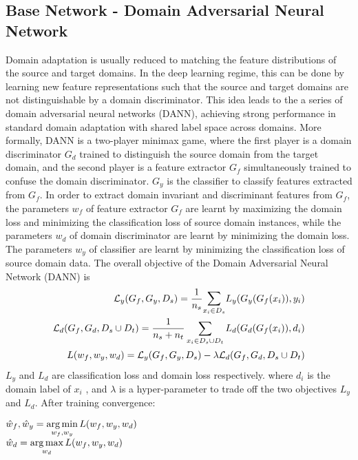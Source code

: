 \subsection{Base Network - Domain Adversarial Neural Network}
Domain adaptation is usually reduced to matching the feature distributions of the source and target domains. In the deep learning regime, this can be done by
learning new feature representations such that the source and target domains
are not distinguishable by a domain discriminator. This idea leads to the a series
of domain adversarial neural networks (DANN)\cite{uda,dann,deeptransfer}, achieving strong performance
in standard domain adaptation with shared label space across domains.
More formally, DANN is a two-player minimax game, where the first player is
a domain discriminator $G_d$ trained to distinguish the source domain from the
target domain, and the second player is a feature extractor $G_f$ simultaneously
trained to confuse the domain discriminator. $G_y$ is the classifier to classify features extracted from $G_f$.
In order to extract domain invariant and discriminant features from $G_f$, the parameters $w_f$ of feature extractor $G_f$ are learnt by maximizing the domain loss and minimizing the classification loss of source domain instances, while the parameters $w_d$ of domain discriminator are learnt by minimizing the domain loss. The parameters $w_y$ of classifier are learnt by minimizing the classification loss of source domain data.
The overall objective of the Domain Adversarial Neural Network (DANN) is
\begin{equation}
\begin{align}
    \mathcal{L}_y(G_f, G_y, D_s)  = \dfrac{1}{n_{s}} \mathlarger\sum\limits_{x_i \in D_s} L_y(G_y(G_f(x_i)),y_i)\\
     \mathcal{L}_d(G_f, G_d, D_s \cup D_t) = \dfrac{1}{n_s + n_t} \sum\limits_{x_i \in {D_s \cup D_t}} L_d(G_d(G_f(x_i)),d_i)\\
     L(w_f, w_y, w_d) = \mathcal{L}_y(G_f, G_y, D_s) - \lambda \mathcal{L}_d(G_f, G_d, D_s \cup D_t)
\end{align}
\end{equation}
$L_y$ and $L_d$ are classification loss and domain loss respectively. where $d_i$ is the domain label of $x_i$ , and $\lambda$ is a hyper-parameter to trade off the
two objectives $L_y$ and $L_d$. After training convergence:
\begin{center}
    $\hat{w}_f, \hat{w}_y  = \operatorname*{arg\,min} \limits_{w_f, w_y} L(w_f, w_y, w_d)$\\
    $\hat{w}_d  = \operatorname*{arg\,max} \limits_{w_d} L(w_f, w_y, w_d)$
\end{center}

